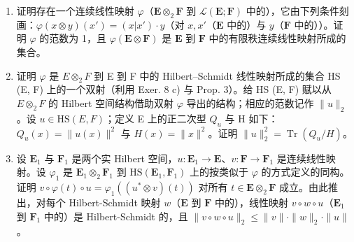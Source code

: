 \begin{enumerate}
\def\labelenumi{\alph{enumi})}
\item
  证明存在一个连续线性映射 \(\varphi\)（\(\mathbf{E} \otimes_2 \mathbf{F}\) 到 \(\mathcal{L}(\mathbf{E}; \mathbf{F})\) 中的），它由下列条件刻画：\(\varphi(x \otimes y)(x') = (x|x') \cdot y\)（对 \(x, x'\)（\(\mathbf{E}\) 中的）与 \(y\)（\(\mathbf{F}\) 中的））。证明 \(\varphi\) 的范数为 1，且 \(\varphi(\mathbf{E} \otimes \mathbf{F})\) 是 \(\mathbf{E}\) 到 \(\mathbf{F}\) 中的有限秩连续线性映射所成的集合。
\item
  证明 \(\varphi\) 是 \(E \otimes_2 F\) 到 E 到 F 中的 Hilbert--Schmidt 线性映射所成的集合 HS (E, F) 上的一个双射（利用 Exer. 8 c) 与 Prop. 3）。给 HS (E, F) 赋以从 \(E \otimes_2 F\) 的 Hilbert 空间结构借助双射 \(\varphi\) 导出的结构；相应的范数记作 \(\|u\|_2\)。设 \(u \in \mathrm{HS}(E, F)\)；定义 E 上的正二次型 \(Q_u\) 与 H 如下：\(Q_u(x) = \|u(x)\|^2\) 与 \(H(x) = \|x\|^2\)。证明 \(\|u\|_2^2 = \operatorname{Tr}(Q_u / H)\)。
\item
  设 \(\mathbf{E}_1\) 与 \(\mathbf{F}_1\) 是两个实 Hilbert 空间，\(u: \mathbf{E}_1 \to \mathbf{E}\)、\(v: \mathbf{F} \to \mathbf{F}_1\) 是连续线性映射。设 \(\varphi_1\) 是 \(\mathbf{E}_1 \otimes_2 \mathbf{F}_1\) 到 \(\mathrm{HS}(\mathbf{E}_1, \mathbf{F}_1)\) 上的按类似于 \(\varphi\) 的方式定义的同构。证明 \(v \circ \varphi(t) \circ u = \varphi_1((u^* \otimes v)(t))\) 对所有 \(t \in \mathbf{E} \otimes_2 \mathbf{F}\) 成立。由此推出，对每个 Hilbert-Schmidt 映射 \(w\)（\(\mathbf{E}\) 到 \(\mathbf{F}\) 中的），线性映射 \(v \circ w \circ u\)（\(\mathbf{E}_1\) 到 \(\mathbf{F}_1\) 中的）是 Hilbert-Schmidt 的，且 \(\|v \circ w \circ u\|_2 \leqslant \|v\| \cdot \|w\|_2 \cdot \|u\|\)。
\end{enumerate}

